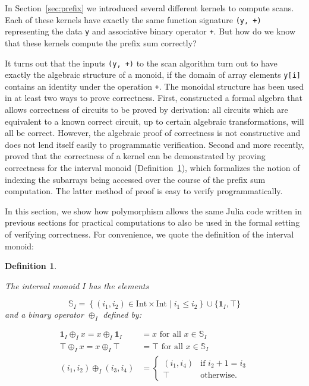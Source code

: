 \documentclass{sig-alternate}
\newcommand{\code}[1]{\texttt{#1}}
\newtheorem{definition}{Definition}
\begin{document}
In Section~\ref{sec:prefix} we introduced several different kernels to compute
scans. Each of these kernels have exactly the same function signature \code{(y,
+)} representing the data \code{y} and associative binary operator \code{+}.
But how do we know that these kernels compute the prefix sum correctly?

It turns out that the inputs \code{(y, +)} to the scan algorithm turn out to
have exactly the algebraic structure of a monoid, if the domain of array
elements \code{y[i]} contains an identity under the operation \code{+}. The
monoidal structure has been used in at least two ways to prove correctness.
First, \cite{Hinze2004} constructed a formal algebra that allows correctness of
circuits to be proved by derivation: all circuits which are equivalent to a
known correct circuit, up to certain algebraic transformations, will all be
correct. However, the algebraic proof of correctness is not constructive and
does not lend itself easily to programmatic verification. Second and more
recently, \cite{Chong2014} proved that the correctness of a kernel can be
demonstrated by proving correctness for the interval monoid
(Definition~\ref{def:intervalmonoid}), which formalizes the notion of indexing
the subarrays being accessed over the course of the prefix sum computation. The
latter method of proof is easy to verify programmatically.

In this section, we show how polymorphism allows the same Julia code written in
previous sections for practical computations to also be used in the formal
setting of verifying correctness. For convenience, we quote the definition of
the interval monoid:

\begin{definition}{\cite[Definition 4.3]{Chong2014}}
\label{def:intervalmonoid}
	
The \textit{interval monoid} $I$ has the elements

\begin{equation}
	\mathbb S_I = \left\{ (i_1, i_2) \in \mathrm{Int} \times \mathrm{Int} \;\vert\; i_1 \le i_2  \right\} \cup \{\mathbf 1_I, \top \}
\end{equation}
%
and a binary operator $\oplus_I$ defined by:

\begin{subequations}
\begin{align}
	\mathbf 1_I \oplus_I x = x \oplus_I \mathbf 1_I &= x \textrm{ for all } x \in \mathbb S_I \\
	\top \oplus_I x = x \oplus_I \top &= \top \textrm{ for all } x \in \mathbb S_I \\
	(i_1, i_2) \oplus_I (i_3, i_4) &= \begin{cases} (i_1, i_4) &\textrm{if } i_2 + 1 = i_3 \\
		\top &\textrm{otherwise.}
\end{cases}
\label{eq:intervalplus}
\end{align}
\end{subequations}

\end{definition}
\end{document}
